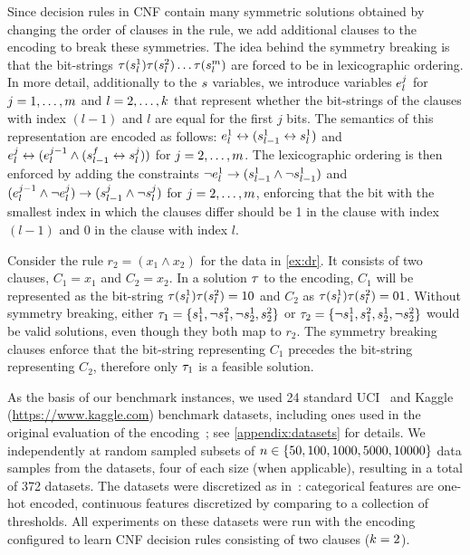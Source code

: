 Since decision rules in CNF contain many symmetric solutions obtained by changing the order of clauses in the rule, we add additional clauses to the encoding to break these symmetries.
The idea behind the symmetry breaking is that the bit-strings $\tau(s_l^1)\tau(s_l^2)\dots\tau(s_l^m)$ are forced to be in lexicographic ordering.
In more detail, additionally to the $s$ variables, we introduce variables $e_l^j$ for $j=1,\dots,m$ and $l=2,\dots,k$ that represent whether the bit-strings of the clauses with index $(l-1)$ and $l$ are equal for the first $j$ bits.
The semantics of this representation are encoded as follows:
$e_l^1 \leftrightarrow (s_{l-1}^1 \leftrightarrow s_l^1)$ and $e_l^j \leftrightarrow (e_l^{j-1} \land (s_{l-1}^f \leftrightarrow s_l^j))$ for $j=2,\dots,m$.
The lexicographic ordering is then enforced by adding the constraints $\lnot e_l^1 \rightarrow (s_{l-1}^1 \land \lnot s_{l-1}^1)$ and $(e_l^{j-1} \land \lnot e_l^j) \rightarrow (s_{l-1}^j \land \lnot s_l^j)$ for $j=2,\dots,m$, enforcing that the bit with the smallest index in which the clauses differ should be 1 in the clause with index $(l-1)$ and 0 in the clause with index $l$.

\begin{example}
  Consider the rule $r_2 = (x_1 \land x_2)$ for the data in \cref{ex:dr}.
  It consists of two clauses, $C_1 = x_1$ and $C_2 = x_2$.
  In a solution $\tau$ to the encoding, $C_1$ will be represented as the bit-string $\tau(s_l^1)\tau(s_l^2)=10$ and $C_2$ as $\tau(s_l^1)\tau(s_l^2)=01$.
  Without symmetry breaking, either $\tau_1 = \{s_1^1, \lnot s_1^2, \lnot s_2^1, s_2^2\}$ or $\tau_2 = \{\lnot s_1^1, s_1^2, s_2^1, \lnot s_2^2\}$ would be valid solutions, even though they both map to $r_2$.
  The symmetry breaking clauses enforce that the bit-string representing $C_1$ precedes the bit-string representing $C_2$, therefore only $\tau_1$ is a feasible solution.
\end{example}

As the basis of our benchmark instances, we used 24 standard UCI~\autocite{UciMlr} and Kaggle ({\small\url{https://www.kaggle.com}}) benchmark datasets, including ones used in the original evaluation of the encoding~\autocite{DBLP:conf/cp/MaliotovM18}; see \cref{appendix:datasets} for details.
We independently at random sampled subsets of $n\in\{50,100,1000,5000,10000\}$ data samples from the datasets, four of each size (when applicable), resulting in a total of 372 datasets.
The datasets were discretized as in~\autocite{DBLP:conf/cp/MaliotovM18}:
categorical features are one-hot encoded, continuous features discretized by comparing to a collection of thresholds.
All experiments on these datasets were run with the encoding configured to learn CNF decision rules consisting of two clauses ($k = 2$).

